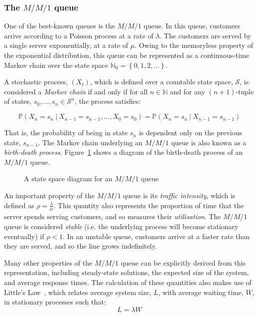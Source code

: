 \subsubsection{The \(M/M/1\) queue}

One of the best-known queues is the \(M/M/1\) queue. In this queue, customers
arrive according to a Poisson process at a rate of \(\lambda\). The customers
are served by a single server exponentially, at a rate of \(\mu\). Owing to the
memoryless property of the exponential distribution, this queue can be
represented as a continuous-time Markov chain over the state space
\(\mathbb{N}_0 = \left\{0, 1, 2, \ldots\right\}\).

A stochastic process, \(\left(X_t\right)\), which is defined over a countable
state space, \(\mathcal S\), is considered a \emph{Markov chain} if and only if
for all \(n \in \mathbb N\) and for any \((n+1)\)-tuple of states, \(s_0,
\ldots, s_n \in \mathcal S^n\), the process satisfies:

\begin{equation}
    \mathbb P \left(X_n = s_n \ | \ X_{n-1} = s_{n-1}, \ldots, X_0 = s_0\right)
    = \mathbb P \left(X_n = s_n \ | \ X_{n-1} = s_{n-1}\right)
\end{equation}

That is, the probability of being in state \(s_n\) is dependent only on the
previous state, \(s_{n-1}\). The Markov chain underlying an \(M/M/1\) queue is
also known as a \emph{birth-death process}. Figure~\ref{fig:birth_death_mm1}
shows a diagram of the birth-death process of an \(M/M/1\) queue.

\begin{figure}[htbp]
    \centering
    \resizebox{\imgwidth}{!}{%
        
    }\caption{
        A state space diagram for an \(M/M/1\) queue%
    }\label{fig:birth_death_mm1}
\end{figure}

An important property of the \(M/M/1\) queue is its \emph{traffic intensity},
which is defined as \(\rho = \frac{\lambda}{\mu}\). This quantity also
represents the proportion of time that the server spends serving customers, and
so measures their \emph{utilisation}. The \(M/M/1\) queue is considered
\emph{stable} (i.e. the underlying process will become stationary eventually) if
\(\rho < 1\). In an unstable queue, customers arrive at a faster rate than they
are served, and so the line grows indefinitely.

Many other properties of the \(M/M/1\) queue can be explicitly derived from this
representation, including steady-state solutions, the expected size of the
system, and average response times. The calculation of these quantities also
makes use of Little's Law~\cite{Little1961}, which relates average system size,
\(L\), with average waiting time, \(W\), in stationary processes such that:
\begin{equation}
    L = \lambda W
\end{equation}

